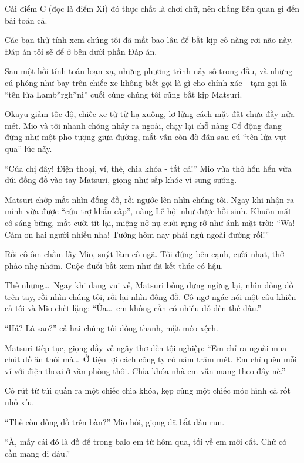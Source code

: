 \documentclass[../main.tex]{subfiles}
\begin{document}
Cái điểm C (đọc là điểm Xi) đó thực chất là chơi chữ, nên chẳng liên quan gì đến bài toán cả.

Các bạn thử tính xem chúng tôi đã mất bao lâu để bắt kịp cô nàng rơi não này. Đáp án tôi sẽ để ở bên dưới phần {\abv Đáp án}.

\il

Sau một hồi tính toán loạn xạ, những phương trình nảy số trong đầu, và những cú phóng như bay trên chiếc xe không biết gọi là gì cho chính xác - tạm gọi là ``tên lửa Lamb*rgh*ni'' cuối cùng chúng tôi cũng bắt kịp Matsuri.

Okayu giảm tốc độ, chiếc xe từ từ hạ xuống, lơ lửng cách mặt đất chưa đầy nửa mét. Mio và tôi nhanh chóng nhảy ra ngoài, chạy lại chỗ nàng Cổ động đang đứng như một pho tượng giữa đường, mắt vẫn còn đờ đẫn sau cú ``tên lửa vụt qua'' lúc nãy.

``Của chị đây! Điện thoại, ví, thẻ, chìa khóa - tất cả!'' Mio vừa thở hổn hển vừa dúi đống đồ vào tay Matsuri, giọng như sắp khóc vì sung sướng.

Matsuri chớp mắt nhìn đống đồ, rồi ngước lên nhìn chúng tôi. Ngay khi nhận ra mình vừa được ``cứu trợ khẩn cấp'', nàng Lễ hội như được hồi sinh. Khuôn mặt cô sáng bừng, mắt cười tít lại, miệng nở nụ cười rạng rỡ như ánh mặt trời: ``Wa! Cảm ơn hai người nhiều nha! Tưởng hôm nay phải ngủ ngoài đường rồi!''

Rồi cô ôm chầm lấy Mio, suýt làm cô ngã. Tôi đứng bên cạnh, cười nhạt, thở phào nhẹ nhõm. Cuộc đuổi bắt xem như đã kết thúc có hậu.

Thế nhưng\dots\ Ngay khi đang vui vẻ, Matsuri bỗng dưng ngừng lại, nhìn đống đồ trên tay, rồi nhìn chúng tôi, rồi lại nhìn đống đồ. Cô ngơ ngác nói một câu khiến cả tôi và Mio chết lặng: ``Ủa\dots\ em không cần có nhiều đồ đến thế đâu.''

``Hả? Là sao?'' cả hai chúng tôi đồng thanh, mặt méo xệch.

Matsuri tiếp tục, giọng đầy vẻ ngây thơ đến tội nghiệp: ``Em chỉ ra ngoài mua chút đồ ăn thôi mà\dots\ Ở tiện lợi cách công ty có năm trăm mét. Em chỉ quên mỗi ví với điện thoại ở văn phòng thôi. Chìa khóa nhà em vẫn mang theo đây nè.''

Cô rút từ túi quần ra một chiếc chìa khóa, kẹp cùng một chiếc móc hình cà rốt nhỏ xíu.

``Thế còn đống đồ trên bàn?'' Mio hỏi, giọng đã bắt đầu run.

``À, mấy cái đó là đồ để trong balo em từ hôm qua, tối về em mới cất. Chứ có cần mang đi đâu.''
\end{document}
